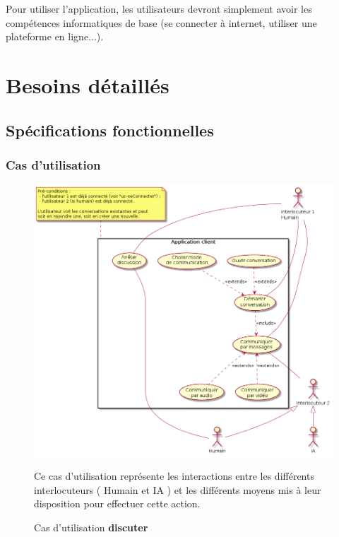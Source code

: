 \documentclass[11pt,dvipsnames,svgnames]{report}
\begin{document}
Pour utiliser l'application, les utilisateurs devront simplement avoir les compétences informatiques de base (se connecter à internet, utiliser une plateforme en ligne...).

\chapter{Besoins détaillés}
\section{Spécifications fonctionnelles}
\subsection*{Cas d'utilisation}
\begin{figure}[H]
\includegraphics[scale=0.55]{images/uc-discuter.png}
\caption{Cas d'utilisation \textbf{discuter}}
	Ce cas d'utilisation représente les interactions entre les différents interlocuteurs ( Humain et IA ) et les différents moyens mis à leur disposition pour effectuer cette action.
\end{figure}
\end{document}
